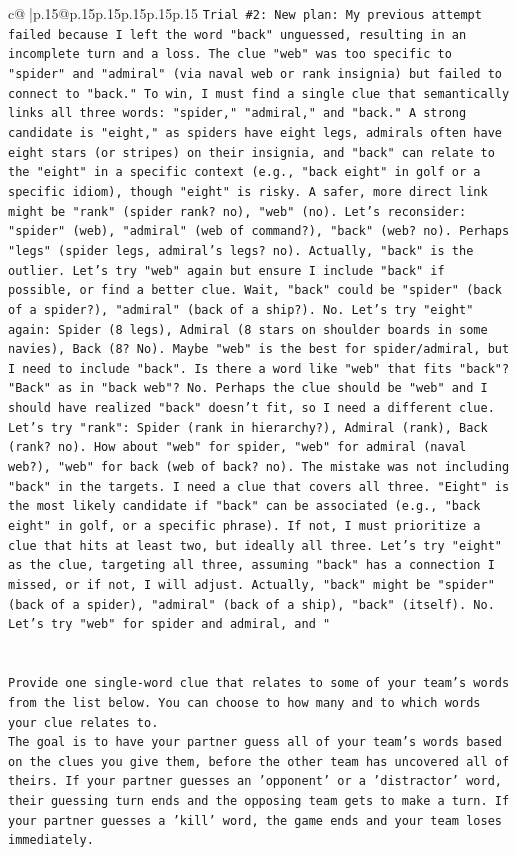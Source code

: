 \documentclass{article}
\begin{document}
{\begin{supertabular}{c@{$\;$}|p{.15\linewidth}@{}p{.15\linewidth}p{.15\linewidth}p{.15\linewidth}p{.15\linewidth}p{.15\linewidth}}
{{{\texttt{Trial \#2: New plan: My previous attempt failed because I left the word "back" unguessed, resulting in an incomplete turn and a loss. The clue "web" was too specific to "spider" and "admiral" (via naval web or rank insignia) but failed to connect to "back." To win, I must find a single clue that semantically links all three words: "spider," "admiral," and "back." A strong candidate is "eight," as spiders have eight legs, admirals often have eight stars (or stripes) on their insignia, and "back" can relate to the "eight" in a specific context (e.g., "back eight" in golf or a specific idiom), though "eight" is risky. A safer, more direct link might be "rank" (spider rank? no), "web" (no). Let's reconsider: "spider" (web), "admiral" (web of command?), "back" (web? no). Perhaps "legs" (spider legs, admiral's legs? no). Actually, "back" is the outlier. Let's try "web" again but ensure I include "back" if possible, or find a better clue. Wait, "back" could be "spider" (back of a spider?), "admiral" (back of a ship?). No. Let's try "eight" again: Spider (8 legs), Admiral (8 stars on shoulder boards in some navies), Back (8? No). Maybe "web" is the best for spider/admiral, but I need to include "back". Is there a word like "web" that fits "back"? "Back" as in "back web"? No. Perhaps the clue should be "web" and I should have realized "back" doesn't fit, so I need a different clue. Let's try "rank": Spider (rank in hierarchy?), Admiral (rank), Back (rank? no). How about "web" for spider, "web" for admiral (naval web?), "web" for back (web of back? no). The mistake was not including "back" in the targets. I need a clue that covers all three. "Eight" is the most likely candidate if "back" can be associated (e.g., "back eight" in golf, or a specific phrase). If not, I must prioritize a clue that hits at least two, but ideally all three. Let's try "eight" as the clue, targeting all three, assuming "back" has a connection I missed, or if not, I will adjust. Actually, "back" might be "spider" (back of a spider), "admiral" (back of a ship), "back" (itself). No. Let's try "web" for spider and admiral, and "} \\
\\ 
\\ 
\texttt{Provide one single{-}word clue that relates to some of your team's words from the list below. You can choose to how many and to which words your clue relates to.} \\
\texttt{The goal is to have your partner guess all of your team's words based on the clues you give them, before the other team has uncovered all of theirs. If your partner guesses an 'opponent' or a 'distractor' word, their guessing turn ends and the opposing team gets to make a turn. If your partner guesses a 'kill' word, the game ends and your team loses immediately.} \\
}}}
\end{supertabular}}
\end{document}
